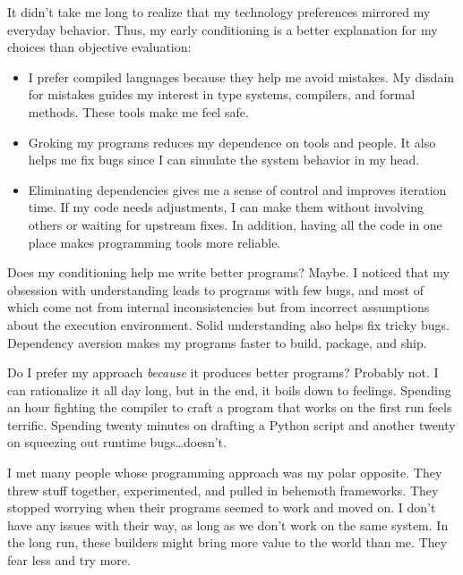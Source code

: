 \documentclass{article}
\begin{document}
It didn't take me long to realize that my technology preferences mirrored my everyday behavior.
Thus, my early conditioning is a better explanation for my choices than objective evaluation:

\begin{itemize}
\item
  I prefer compiled languages because they help me avoid mistakes.
  My disdain for mistakes guides my interest in type systems, compilers, and formal methods.
  These tools make me feel safe.
\item
  Groking my programs reduces my dependence on tools and people.
  It also helps me fix bugs since I can simulate the system behavior in my head.
\item
  Eliminating dependencies gives me a sense of control and improves iteration time.
  If my code needs adjustments, I can make them without involving others or waiting for upstream fixes.
  In addition, having all the code in one place makes programming tools more reliable.
\end{itemize}

Does my conditioning help me write better programs? Maybe.
I noticed that my obsession with understanding leads to programs with few bugs,
and most of which come not from internal inconsistencies but from incorrect assumptions about the execution environment.
Solid understanding also helps fix tricky bugs.
Dependency aversion makes my programs faster to build, package, and ship.

Do I prefer my approach \emph{because} it produces better programs? Probably not.
I can rationalize it all day long,  but in the end, it boils down to feelings.
Spending an hour fighting the compiler to craft a program that works on the first run feels terrific.
Spending twenty minutes on drafting a Python script and another twenty on squeezing out runtime bugs\ldots  doesn't.

I met many people whose programming approach was my polar opposite.
They threw stuff together, experimented, and pulled in behemoth frameworks.
They stopped worrying when their programs seemed to work and moved on.
I don't have any issues with their way, as long as we don't work on the same system.
In the long run, these builders might bring more value to the world than me.
They fear less and try more.
\end{document}
